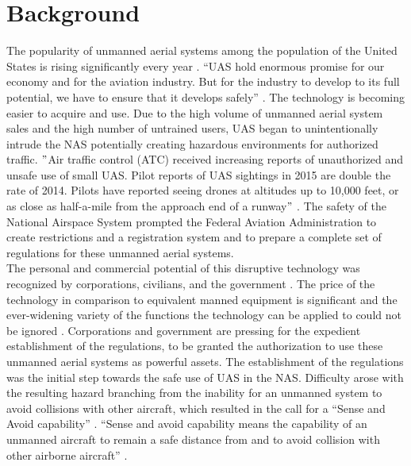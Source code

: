 \section{Background}
\indent The popularity of unmanned aerial systems among the population of the United States is rising significantly every year \cite{[5],[7]}. “UAS hold enormous promise for our economy and for the aviation industry. But for the industry to develop to its full potential, we have to ensure that it develops safely” \cite{[5]}. The technology is becoming easier to acquire and use. Due to the high volume of unmanned aerial system sales and the high number of untrained users, UAS began to unintentionally intrude the NAS potentially creating hazardous environments for authorized traffic. $"$Air traffic control (ATC) received increasing reports of unauthorized and unsafe use of small UAS. Pilot reports of UAS sightings in 2015 are double the rate of 2014. Pilots have reported seeing drones at altitudes up to 10,000 feet, or as close as half-a-mile from the approach end of a runway$"$ \cite{[5]}. The safety of the National Airspace System prompted the Federal Aviation Administration to create restrictions \cite{[1],[2],[3],[5],[6]} and a registration system \cite{[1],[2],[5],[6]} and to prepare a complete set of regulations \cite{[4],[7],[8],[9]} for these unmanned aerial systems.\\ 
\indent The personal and commercial potential of this disruptive technology was recognized by corporations, civilians, and the government \cite{[1],[5]}. The price of the technology in comparison to equivalent manned equipment is significant and the ever-widening variety of the functions the technology can be applied to could not be ignored \cite{[1],[5]}. Corporations and government are pressing for the expedient establishment of the regulations, to be granted the authorization to use these unmanned aerial systems as powerful assets. The establishment of the regulations was the initial step towards the safe use of UAS in the NAS. Difficulty arose with the resulting hazard branching from the inability for an unmanned system to avoid collisions with other aircraft, which resulted in the call for a “Sense and Avoid capability” \cite{[2],[7],[8],[9]}. “Sense and avoid capability means the capability of an unmanned aircraft to remain a safe distance from and to avoid collision with other airborne aircraft” \cite{[2]}.\\ 
